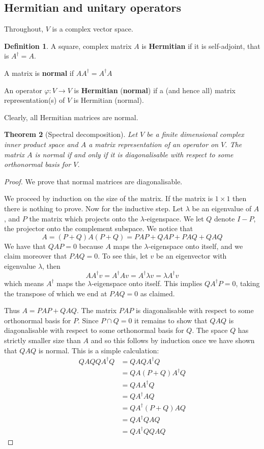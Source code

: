 \documentclass[12pt]{article}
\theoremstyle{plain}
\newtheorem{thm}{Theorem}[subsection] %
\theoremstyle{definition}
\newtheorem{defn}[thm]{Definition} %
\newcommand{\lto}{\longrightarrow}
\begin{document}
\subsection{Hermitian and unitary operators}\label{sec:Hermitian_Unitary}
Throughout, $V$ is a complex vector space.
\begin{defn}
	A square, complex matrix $A$ is \textbf{Hermitian} if it is self-adjoint, that is $A^\dagger = A$.
	
	A matrix is \textbf{normal} if $AA^\dagger = A^\dagger A$
	
	An operator $\varphi:V \lto V$ is \textbf{Hermitian} (\textbf{normal}) if a (and hence all) matrix representation(s) of $V$ is Hermitian (normal).
\end{defn}
Clearly, all Hermitian matrices are normal.
\begin{thm}[Spectral decomposition]\label{thm:spectral}
	Let $V$ be a finite dimensional complex inner product space and $A$ a matrix representation of an operator on $V$. The matrix $A$ is normal if and only if it is diagonalisable with respect to some orthonormal basis for $V$.
\end{thm}
\begin{proof}
	We prove that normal matrices are diagonalisable.
	
	We proceed by induction on the size of the matrix. If the matrix is $1\times 1$ then there is nothing to prove. Now for the inductive step. Let $\lambda$ be an eigenvalue of $A$, and $P$ the matrix which projects onto the $\lambda$-eigenspace. We let $Q$ denote $I - P$, the projector onto the complement subspace.  We notice that
	\begin{equation}
		A = (P + Q)A(P + Q)= PAP + QAP + PAQ + QAQ
	\end{equation}
	We have that $QAP = 0$ because $A$ maps the $\lambda$-eigenspace onto itself, and we claim moreover that $PAQ = 0$. To see this, let $v$ be an eigenvector with eigenvalue $\lambda$, then
	\begin{equation}
		AA^{\dagger}v = A^{\dagger}Av = A^{\dagger} \lambda v = \lambda A^\dagger v
	\end{equation}
	which means $A^\dagger$ maps the $\lambda$-eigenspace onto itself. This implies $QA^\dagger P = 0$, taking the transpose of which we end at $P A Q = 0$ as claimed.
	
	Thus $A = PAP + QAQ$. The matrix $PAP$ is diagonalisable with respect to some orthonormal basis for $P$. Since $P \cap Q = 0$ it remains to show that $QAQ$ is diagonalisable with respect to some orthonormal basis for $Q$. The space $Q$ has strictly smaller size than $A$ and so this follows by induction once we have shown that $QAQ$ is normal. This is a simple calculation:
	\begin{align*}
		QAQQA^\dagger Q &= QAQA^\dagger Q\\
		&= QA(P + Q)A^\dagger Q\\
		&= QAA^\dagger Q\\
		&= QA^\dagger AQ\\
		&= QA^\dagger (P + Q)AQ\\
		&= QA^\dagger QAQ \\
		&= QA^\dagger QQ A Q
	\end{align*}
\end{proof}
\end{document}
